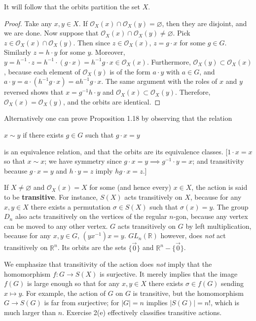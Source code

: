 \documentclass[leqno]{book}
\begin{document}
\noindent It will follow that the orbits partition the set $X$.
\begin{proof}
Take any $x,y\in X$.  If $\mathcal O_X(x)\cap\mathcal O_X(y)=\varnothing$, then they are disjoint, and we are done.  Now suppose that $\mathcal O_X(x)\cap\mathcal O_X(y)\ne\varnothing$.  Pick $z\in\mathcal O_X(x)\cap\mathcal O_X(y)$.  Then since $z\in\mathcal O_X(x)$, $z=g\cdot x$ for some $g\in G$.  Similarly $z=h\cdot y$ for some $y$.  Moreover, $y=h^{-1}\cdot z=h^{-1}\cdot(g\cdot x)=h^{-1}g\cdot x\in\mathcal O_X(x)$.  Furthermore, $\mathcal O_X(y)\subset\mathcal O_X(x)$, because each element of $\mathcal O_X(y)$ is of the form $a\cdot y$ with $a\in G$, and $a\cdot y=a\cdot(h^{-1}g\cdot x)=ah^{-1}g\cdot x$.  The same argument with the roles of $x$ and $y$ reversed shows that $x=g^{-1}h\cdot y$ and $\mathcal O_X(x)\subset\mathcal O_X(y)$.  Therefore, $\mathcal O_X(x)=\mathcal O_X(y)$, and the orbits are identical.
\end{proof}
Alternatively one can prove Proposition 1.18 by observing that the relation
\begin{center}
$x\sim y$ if there exists $g\in G$ such that $g\cdot x=y$
\end{center}
is an equivalence relation, and that the orbits are its equivalence classes.  [$1\cdot x=x$ so that $x\sim x$; we have symmetry since $g\cdot x=y\implies g^{-1}\cdot y=x$; and transitivity because $g\cdot x=y$ and $h\cdot y=z$ imply $hg\cdot x=z$.]

If $X\ne\varnothing$ and $\mathcal O_X(x)=X$ for some (and hence every) $x\in X$, the action is said to be \textbf{transitive}.  For instance, $S(X)$ acts transitively on $X$, because for any $x,y\in X$ there exists a permutation $\sigma\in S(X)$ such that $\sigma(x)=y$.  The group $D_n$ also acts transitively on the vertices of the regular $n$-gon, because any vertex can be moved to any other vertex.  $G$ acts transitively on $G$ by left multiplication, because for any $x,y\in G$, $(yx^{-1})x=y$.  $GL_n(\mathbb R)$ however, does \emph{not} act transitively on $\mathbb R^n$.  Its orbits are the sets $\{\vec 0\}$ and $\mathbb R^n-\{\vec 0\}$.

We emphasize that transitivity of the action does \emph{not} imply that the homomorphism $f:G\to S(X)$ is surjective.  It merely implies that the image $f(G)$ is large enough so that for any $x,y\in X$ there exists $\sigma\in f(G)$ sending $x\mapsto y$.  For example, the action of $G$ on $G$ is transitive, but the homomorphism $G\to S(G)$ is far from surjective; for $|G|=n$ implies $|S(G)|=n!$, which is much larger than $n$.  Exercise 2(e) effectively classifies transitive actions.
\end{document}
